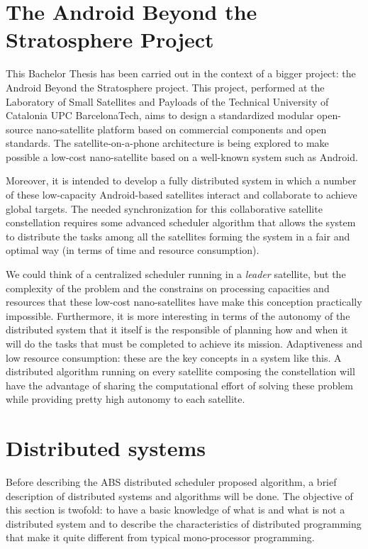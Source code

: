 \section{The Android Beyond the Stratosphere Project}

This Bachelor Thesis has been carried out in the context of a bigger project: the Android Beyond the Stratosphere project. This project, performed at the Laboratory of Small Satellites and Payloads of the Technical University of Catalonia UPC BarcelonaTech, aims to design a standardized modular open-source nano-satellite platform based on commercial components and open standards. The satellite-on-a-phone architecture is being explored to make possible a low-cost nano-satellite based on a well-known system such as Android.

Moreover, it is intended to develop a fully distributed system in which a number of these low-capacity Android-based satellites interact and collaborate to achieve global targets. The needed synchronization for this collaborative satellite constellation requires some advanced scheduler algorithm that allows the system to distribute the tasks among all the satellites forming the system in a fair and optimal way (in terms of time and resource consumption).

We could think of a centralized scheduler running in a \emph{leader} satellite, but the complexity of the problem and the constrains on processing capacities and resources that these low-cost nano-satellites have make this conception practically impossible. Furthermore, it is more interesting in terms of the autonomy of the distributed system that it itself is the responsible of planning how and when it will do the tasks that must be completed to achieve its mission. Adaptiveness and low resource consumption: these are the key concepts in a system like this. A distributed algorithm running on every satellite composing the constellation will have the advantage of sharing the computational effort of solving these problem while providing pretty high autonomy to each satellite.



\section{Distributed systems}

Before describing the ABS distributed scheduler proposed algorithm, a brief description of distributed systems and algorithms will be done. The objective of this section is twofold: to have a basic knowledge of what is and what is not a distributed system and to describe the characteristics of distributed programming that make it quite different from typical mono-processor programming.

